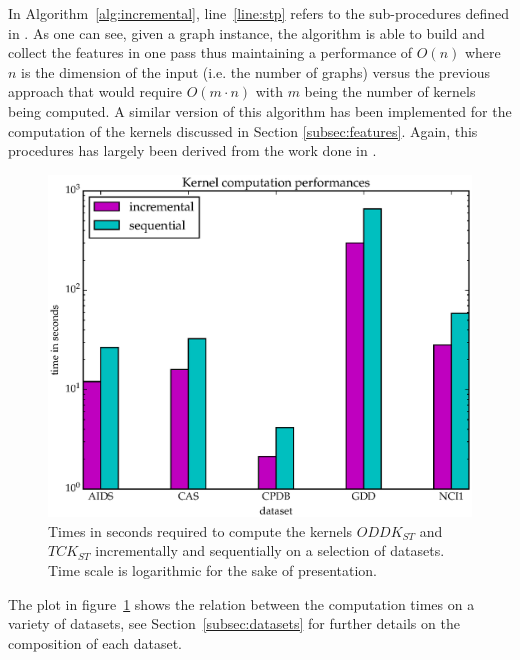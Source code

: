 In Algorithm~\ref{alg:incremental}, line~\ref{line:stp} refers to the sub-procedures
defined in \cite{nnavarin, rtesselli}.
As one can see, given a graph instance, the algorithm is able to build and
collect the features in one pass thus maintaining a performance of $O(n)$ where
$n$ is the dimension of the input (i.e. the number of graphs) versus the
previous approach that would require $O(m \cdot n)$ with $m$ being the number of
kernels being computed.
A similar version of this algorithm has been implemented for the computation
of the kernels discussed in Section \ref{subsec:features}.
Again, this procedures has largely been derived from the work done in \cite{nnavarin, rtesselli}.

\begin{figure}[ht]
    \centering
    \includegraphics[scale=0.5]{Figures/kernel_times_log}
    \caption{Times in seconds required to compute the kernels $ODDK_{ST}$ and 
    $TCK_{ST}$ incrementally and sequentially on a selection of datasets. Time
    scale is logarithmic for the sake of presentation.}
    \label{fig:times}
\end{figure}

The plot in figure~\ref{fig:times} shows the relation between the computation times
on a variety of datasets, see Section~\ref{subsec:datasets} for further details on
the composition of each dataset.


